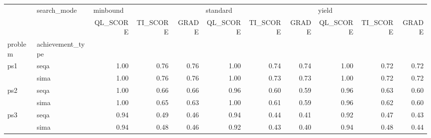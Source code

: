 \begin{tabular}{llrrrrrrrrr}
\toprule
    & search\_mode & \multicolumn{3}{l}{minbound} & \multicolumn{3}{l}{standard} & \multicolumn{3}{l}{yield} \\
    & {} & QL\_SCORE & TI\_SCORE & GRADE & QL\_SCORE & TI\_SCORE & GRADE & QL\_SCORE & TI\_SCORE & GRADE \\
problem & achievement\_type &          &          &       &          &          &       &          &          &       \\
\midrule
ps1 & seqa &     1.00 &     0.76 &  0.76 &     1.00 &     0.74 &  0.74 &     1.00 &     0.72 &  0.72 \\
    & sima &     1.00 &     0.76 &  0.76 &     1.00 &     0.73 &  0.73 &     1.00 &     0.72 &  0.72 \\
ps2 & seqa &     1.00 &     0.66 &  0.66 &     0.96 &     0.60 &  0.59 &     0.96 &     0.63 &  0.60 \\
    & sima &     1.00 &     0.65 &  0.63 &     1.00 &     0.61 &  0.59 &     0.96 &     0.62 &  0.60 \\
ps3 & seqa &     0.94 &     0.49 &  0.46 &     0.94 &     0.44 &  0.41 &     0.92 &     0.47 &  0.43 \\
    & sima &     0.94 &     0.48 &  0.46 &     0.92 &     0.43 &  0.40 &     0.94 &     0.48 &  0.44 \\
\bottomrule
\end{tabular}
